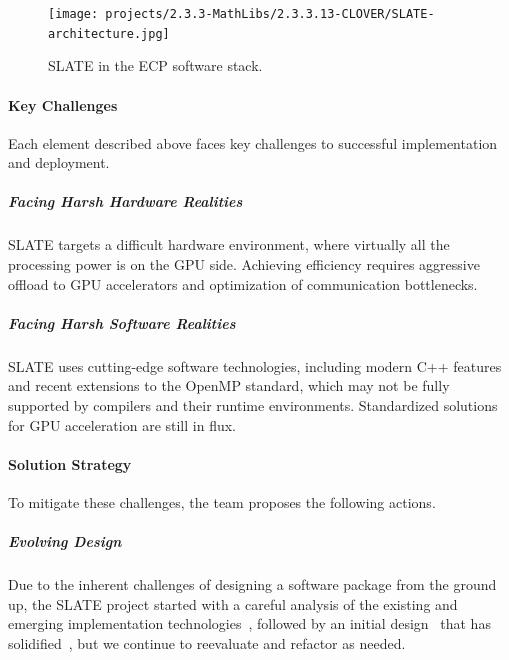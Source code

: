 \begin{figure}[htb]
    \centering
    \texttt{[image: projects/2.3.3-MathLibs/2.3.3.13-CLOVER/SLATE-architecture.jpg]}
    \caption{\label{fig:slate-architecture}
    SLATE in the ECP software stack.}
\end{figure}

\paragraph{Key Challenges}
Each element described above faces key challenges to successful implementation and deployment.




\subparagraph{Facing Harsh Hardware Realities}
SLATE targets a difficult hardware environment, where virtually
all the processing power is on the GPU side.
Achieving efficiency requires aggressive offload to GPU accelerators
and optimization of communication bottlenecks.


\subparagraph{Facing Harsh Software Realities}
SLATE uses cutting-edge software technologies,
including modern C++ features and recent extensions
to the OpenMP standard, which may not be fully supported by compilers
and their runtime environments.
Standardized solutions for GPU acceleration are still in flux.



\paragraph{Solution Strategy}
To mitigate these challenges, the team proposes the following actions.


\subparagraph{Evolving Design}
Due to the inherent challenges of designing a software package
from the ground up, the SLATE project started
with a careful analysis of the existing and emerging
implementation technologies~\cite{abdelfattah2017roadmap},
followed by an initial design~\cite{kurzak2017designing}
that has solidified~\cite{gates2019slate-design},
but we continue to reevaluate and refactor as needed.

